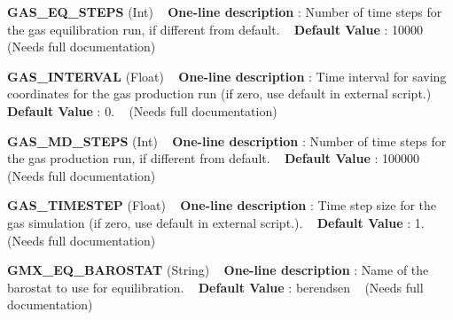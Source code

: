 \begin{DoxyItemize}
\item {\bfseries  G\+A\+S\+\_\+\+E\+Q\+\_\+\+S\+T\+E\+PS } (Int) ~\newline
{\bfseries  One-\/line description }\+: Number of time steps for the gas equilibration run, if different from default. ~\newline
{\bfseries  Default Value }\+: 10000 ~\newline
(Needs full documentation)\end{DoxyItemize}
\begin{DoxyItemize}
\item {\bfseries  G\+A\+S\+\_\+\+I\+N\+T\+E\+R\+V\+AL } (Float) ~\newline
{\bfseries  One-\/line description }\+: Time interval for saving coordinates for the gas production run (if zero, use default in external script.) ~\newline
{\bfseries  Default Value }\+: 0. ~\newline
(Needs full documentation)\end{DoxyItemize}
\begin{DoxyItemize}
\item {\bfseries  G\+A\+S\+\_\+\+M\+D\+\_\+\+S\+T\+E\+PS } (Int) ~\newline
{\bfseries  One-\/line description }\+: Number of time steps for the gas production run, if different from default. ~\newline
{\bfseries  Default Value }\+: 100000 ~\newline
(Needs full documentation)\end{DoxyItemize}
\begin{DoxyItemize}
\item {\bfseries  G\+A\+S\+\_\+\+T\+I\+M\+E\+S\+T\+EP } (Float) ~\newline
{\bfseries  One-\/line description }\+: Time step size for the gas simulation (if zero, use default in external script.). ~\newline
{\bfseries  Default Value }\+: 1. ~\newline
(Needs full documentation)\end{DoxyItemize}
\begin{DoxyItemize}
\item {\bfseries  G\+M\+X\+\_\+\+E\+Q\+\_\+\+B\+A\+R\+O\+S\+T\+AT } (String) ~\newline
{\bfseries  One-\/line description }\+: Name of the barostat to use for equilibration. ~\newline
{\bfseries  Default Value }\+: berendsen ~\newline
(Needs full documentation)\end{DoxyItemize}

